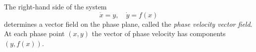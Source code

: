 The right-hand side of the system
$$\dot{x} = y, \quad \dot{y} = f(x)$$
determines a vector field on the phase plane, called the \textit{phase velocity vector field}.
At each phase point $(x, y)$ the vector of phase velocity has components $(y, f(x))$.
